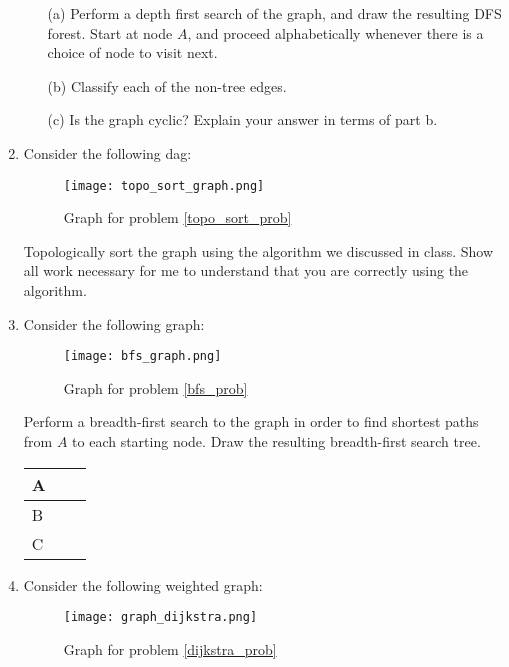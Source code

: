 \documentclass[12pt]{article}
\begin{document}
\begin{enumerate}
    \begin{itemize}
        \item[(a)] Perform a depth first search of the graph, and draw the resulting DFS forest. Start at node $A$, and proceed alphabetically whenever there is a choice of node to visit next. 
        \item[(b)] Classify each of the non-tree edges.  
        \item[(c)] Is the graph cyclic? Explain your answer in terms of part b. 
    \end{itemize}
    \label{dfs_prob}
    \newpage
    \item Consider the following dag:
    \begin{figure}[h]
        \centering
        \caption{Graph for problem \ref{topo_sort_prob}}
        \texttt{[image: topo\_sort\_graph.png]}
    \end{figure}
    Topologically sort the graph using the algorithm we discussed in class. Show all work necessary for me to understand that you are correctly using the algorithm. 
    \label{topo_sort_prob}
    \newpage
    \item Consider the following graph: \label{bfs}
    \begin{figure}[h]
        \centering
        \caption{Graph for problem \ref{bfs_prob}}
        \texttt{[image: bfs\_graph.png]}
    \end{figure}
     Perform a breadth-first search to the graph in order to find shortest paths from $A$ to each starting node. Draw the resulting breadth-first search tree.
     \begin{tabular}{  m{5em} | m{1cm}| m{1cm}  } 
        \hline
         A & \hspace{1cm} & \hspace{1cm} \\
        \hline
         B & \hspace{1cm} & \hspace{1cm} \\ 
        \hline
        C & \hspace{1cm} & \hspace{1cm} \\ 
        \hline
      \end{tabular} 
    \newpage
    \item Consider the following weighted graph:
    \begin{figure}[h]
        \centering
        \caption{Graph for problem \ref{dijkstra_prob}}
        \texttt{[image: graph\_dijkstra.png]}

\end{figure}
\end{enumerate}
\end{document}
